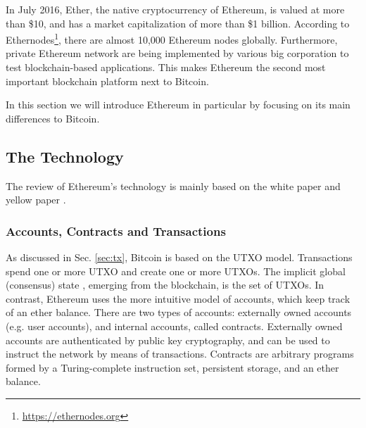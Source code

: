 In July 2016, Ether, the native cryptocurrency of Ethereum, is valued at more than \$10, and has a market capitalization of more than \$1 billion. According to Ethernodes\footnote{\url{https://ethernodes.org}}, there are almost 10,000 Ethereum nodes globally. Furthermore, private Ethereum network are being implemented by various big corporation to test blockchain-based applications. This makes Ethereum the second most important blockchain platform next to Bitcoin.

In this section we will introduce Ethereum in particular by focusing on its main differences to Bitcoin. 

\subsection{The Technology}
\label{sec:ethereum:tech}

The review of Ethereum's technology is mainly based on the white paper \parencite{ethereumWhite} and yellow paper \parencite{wood2014ethereum}. 

\subsubsection{Accounts, Contracts and Transactions}
\label{sec:ethereum:tech:tx}
As discussed in Sec. \ref{sec:tx}, Bitcoin is based on the UTXO model. Transactions spend one or more UTXO and create one or more UTXOs. The implicit global (consensus) state , emerging from the blockchain, is the set of UTXOs. In contrast, Ethereum uses the more intuitive model of accounts, which keep track of an ether balance. There are two types of accounts: externally owned accounts (e.g. user accounts), and internal accounts, called contracts. Externally owned accounts are authenticated by public key cryptography, and can be used to instruct the network by means of transactions. Contracts are arbitrary programs formed by a Turing-complete instruction set, persistent storage, and an ether balance. 

